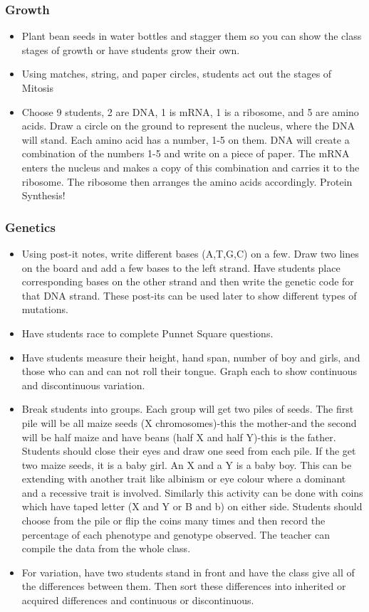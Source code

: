 \subsubsection{Growth}
\begin{itemize}
\item	Plant bean seeds in water bottles and stagger them so you can show the class stages of growth or have students grow their own.
\item	Using matches, string, and paper circles, students act out the stages of Mitosis
\item	Choose 9 students, 2 are DNA, 1 is mRNA, 1 is a ribosome, and 5 are amino acids. Draw a circle on the ground to represent the nucleus, where the DNA will stand.  Each amino acid has a number, 1-5 on them.  DNA will create a combination of the numbers 1-5 and write on a piece of paper.  The mRNA enters the nucleus and makes a copy of this combination and carries it to the ribosome.  The ribosome then arranges the amino acids accordingly.  Protein Synthesis!
\end{itemize}

\subsubsection{Genetics}
\begin{itemize}
\item Using post-it notes, write different bases (A,T,G,C) on a few.  Draw two lines on the board and add a few bases to the left strand.  Have students place corresponding bases on the other strand and then write the genetic code for that DNA strand.  These post-its can be used later to show different types of mutations.
\item Have students race to complete Punnet Square questions.
\item Have students measure their height, hand span, number of boy and girls, and those who can and can not roll their tongue.  Graph each to show continuous and discontinuous variation.
\item Break students into groups. Each group will get two piles of seeds. The first pile will be all maize seeds (X chromosomes)-this the mother-and the second will be half maize and have beans (half X and half Y)-this is the father. Students should close their eyes and draw one seed from each pile. If the get two maize seeds, it is a baby girl. An X and a Y is a baby boy. This can be extending with another trait like albinism or eye colour where a dominant and a recessive trait is involved.
Similarly this activity can be done with coins which have taped letter (X and Y or B and b) on either side. Students should choose from the pile or flip the coins many times and then record the percentage of each phenotype and genotype observed. The teacher can compile the data from the whole class.
\item For variation, have two students stand in front and have the class give all of the differences between them. Then sort these differences into inherited or acquired differences and continuous or discontinuous.
\end{itemize}

